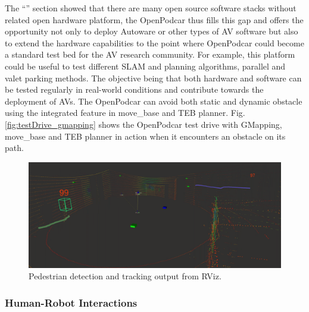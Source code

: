 \documentclass[a4paper]{article}
\begin{document}
	The ``'' section showed that there are many open source software stacks without related open hardware platform, the OpenPodcar thus fills this gap and offers the opportunity not only to deploy Autoware or other types of AV software but also to extend the hardware capabilities to the point where OpenPodcar could become a standard test bed for the AV research community. For example, this platform could be useful to test different SLAM and planning algorithms, parallel and valet parking methods. The objective being that both hardware and software can be tested regularly in real-world conditions and contribute towards the deployment of AVs. The OpenPodcar can avoid both static and dynamic obstacle using the integrated feature in move\_base and TEB planner. Fig. \ref{fig:testDrive_gmapping} shows the OpenPodcar test drive with GMapping, move\_base and TEB planner in action when it encounters an obstacle on its path.     
	
	\begin{figure}
		\centering
		\includegraphics[width=0.9\columnwidth]{software/tracker.png}
		\caption{Pedestrian detection and tracking output from RViz.}
		\label{fig:detection_tracking}
	\end{figure}
	
	\subsubsection{Human-Robot Interactions}
	
\end{document}
